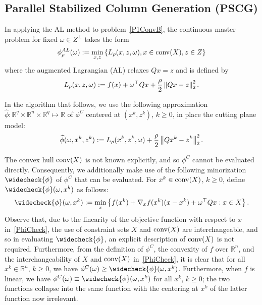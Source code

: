 \subsection{Parallel Stabilized Column Generation (PSCG)}

In applying the AL method to problem~\eqref{P1ConvB}, 
the continuous master problem for fixed $\omega \in Z^\perp$ takes the form
\begin{equation}\label{EqQMPConv}
\phi_\rho^{AL}(\omega):=\min_{x,z} \left\{ L_\rho(x,z,\omega), x \in \operatorname{conv}(X), z \in Z \right \}
\end{equation}
where the augmented Lagrangian (AL) relaxes $Qx=z$ and is defined by
\begin{equation}\label{ALDefn}
L_\rho(x,z,\omega):= f(x) + \omega^\top Qx + \frac{\rho}{2}\left \| Qx-z \right \|_2^2.
\end{equation}







In the algorithm that follows, we use the following approximation $\widehat{\phi} : \mathbb{R}^q \times \mathbb{R}^n \times \mathbb{R}^q \mapsto \mathbb{R}$ of $\phi^C$ centered at $(x^k,z^k)$, $k \ge 0$, in place the cutting plane model:
\begin{align*}
\widehat{\phi}(\omega,x^k,z^k) := L_\rho(x^k,z^k,\omega) + \frac{\rho}{2} \left \| Qx^k-z^k \right \|_2^2.
\end{align*}



The convex hull $\operatorname{conv}(X)$ is not known explicitly, and so $\phi^C$ cannot be evaluated directly. 
Consequently, we additionally make use of the following minorization $\widecheck{\phi}$ of $\phi^C$ that can be evaluated.
For $x^k \in \operatorname{conv}(X)$, $k \ge 0$, define $\widecheck{\phi}(\omega,x^k)$ as follows:
\begin{equation}\label{PhiCheck}
\widecheck{\phi}(\omega,x^k) := \min_x \braces{f(x^k) + \nabla_x f(x^k)(x-x^k) + \omega^\top Qx : x \in X}.
\end{equation}
Observe that, due to the linearity of the objective function with respect to $x$ in~\eqref{PhiCheck}, the use of constraint sets $X$ and $\operatorname{conv}(X)$ are interchangeable, 
and so in evaluating $\widecheck{\phi}$, an explicit description of  $\operatorname{conv}(X)$ is not required. 
Furthermore, from the definition of $\phi^C$, the convexity of $f$ over $\mathbb{R}^n$, and the interchangeability of $X$ and $\operatorname{conv}(X)$ in~\eqref{PhiCheck}, it is clear that for all $x^k \in \mathbb{R}^n$, $k \ge 0$, we have $\phi^C(\omega) \ge \widecheck{\phi}(\omega,x^k)$. Furthermore, when $f$ is linear, we have $\phi^C(\omega) \equiv \widecheck{\phi}(\omega,x^k)$ for all $x^k$, $k \ge 0$; the two functions collapse into the same function with the centering at $x^k$ of the latter function now  irrelevant. 


